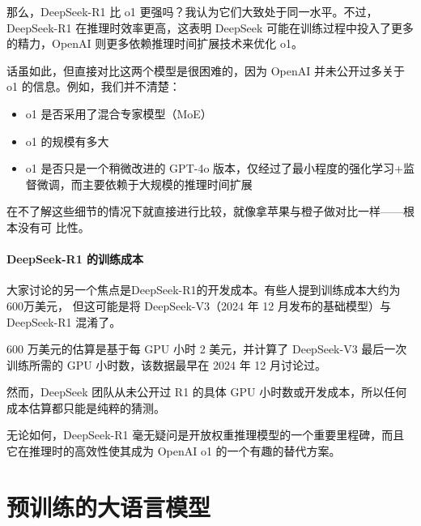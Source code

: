 \documentclass[lang=cn,newtx,10pt,scheme=chinese]{elegantbook}
\begin{document}
那么，DeepSeek-R1 比 o1 更强吗？我认为它们大致处于同一水平。不过，DeepSeek-R1 在推理时效率更高，这表明 DeepSeek 可能在训练过程中投入了更多的精力，OpenAI 则更多依赖推理时间扩展技术来优化 o1。

话虽如此，但直接对比这两个模型是很困难的，因为 OpenAI 并未公开过多关于 o1 的信息。例如，我们并不清楚：

\begin{itemize}
\item o1 是否采用了混合专家模型（MoE）
\item o1 的规模有多大
\item o1 是否只是一个稍微改进的 GPT-4o 版本，仅经过了最小程度的强化学习+监督微调，而主要依赖于大规模的推理时间扩展
\end{itemize}

在不了解这些细节的情况下就直接进行比较，就像拿苹果与橙子做对比一样——根本没有可 比性。

\subsubsection{DeepSeek-R1 的训练成本}

大家讨论的另一个焦点是DeepSeek-R1的开发成本。有些人提到训练成本大约为600万美元， 但这可能是将 DeepSeek-V3（2024 年 12 月发布的基础模型）与 DeepSeek-R1 混淆了。

600 万美元的估算是基于每 GPU 小时 2 美元，并计算了 DeepSeek-V3 最后一次训练所需的 GPU 小时数，该数据最早在 2024 年 12 月讨论过。

然而，DeepSeek 团队从未公开过 R1 的具体 GPU 小时数或开发成本，所以任何成本估算都只能是纯粹的猜测。

无论如何，DeepSeek-R1 毫无疑问是开放权重推理模型的一个重要里程碑，而且它在推理时的高效性使其成为 OpenAI o1 的一个有趣的替代方案。



\chapter{预训练的大语言模型}
\end{document}
